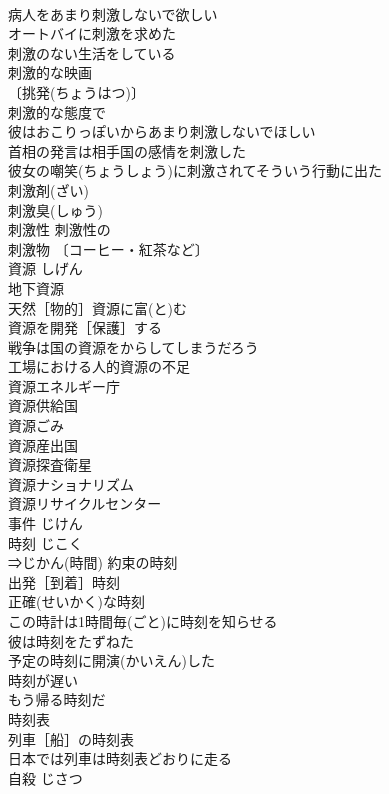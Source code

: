 \documentclass[8pt]{extreport}
\begin{document}
\begin{CJK}{UTF8}{min}
\\	病人をあまり刺激しないで欲しい 
\\	オートバイに刺激を求めた 
\\	刺激のない生活をしている 
\\	刺激的な映画 
\\	〔挑発(ちょうはつ)〕
\\	刺激的な態度で 
\\	彼はおこりっぽいからあまり刺激しないでほしい 
\\	首相の発言は相手国の感情を刺激した 
\\	彼女の嘲笑(ちょうしょう)に刺激されてそういう行動に出た 
\\	刺激剤(ざい) 
\\	刺激臭(しゅう) 
\\	刺激性 刺激性の 
\\	刺激物 〔コーヒー・紅茶など〕
\\	資源	しげん	
\\	地下資源 
\\	天然［物的］資源に富(と)む 
\\	資源を開発［保護］する 
\\	戦争は国の資源をからしてしまうだろう 
\\	工場における人的資源の不足 
\\	資源エネルギー庁 
\\	資源供給国 
\\	資源ごみ 
\\	資源産出国 
\\	資源探査衛星 
\\	資源ナショナリズム 
\\	資源リサイクルセンター 
\\	事件	じけん	
\\	時刻	じこく	
\\	⇒じかん(時間) 約束の時刻 
\\	出発［到着］時刻 
\\	正確(せいかく)な時刻 
\\	この時計は1時間毎(ごと)に時刻を知らせる 
\\	彼は時刻をたずねた 
\\	予定の時刻に開演(かいえん)した 
\\	時刻が遅い 
\\	もう帰る時刻だ 
\\	時刻表 
\\	列車［船］の時刻表 
\\	日本では列車は時刻表どおりに走る 
\\	自殺	じさつ	

\end{CJK}
\end{document}
